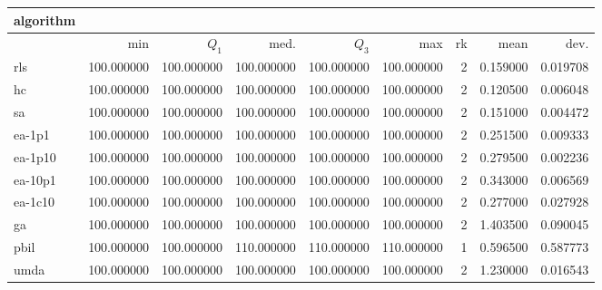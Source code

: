 \begin{tabular}{@{}l*{5}{>{{}}N{3}{0}}>{{}}N{2}{0}N{1}{3}N{1}{3}@{}}
\toprule
{algorithm} &  &  \\
\midrule
& {min} & {$Q_1$} & {med.} & {$Q_3$} & {max} & {rk} & {mean} & {dev.} \\
\midrule
rls & {\color{blue}} 100.000000 & {\color{blue}} 100.000000 & 100.000000 & 100.000000 & 100.000000 & 2 & 0.159000 & 0.019708 \\
 hc & {\color{blue}} 100.000000 & {\color{blue}} 100.000000 & 100.000000 & 100.000000 & 100.000000 & 2 & 0.120500 & 0.006048 \\
 sa & {\color{blue}} 100.000000 & {\color{blue}} 100.000000 & 100.000000 & 100.000000 & 100.000000 & 2 & 0.151000 & 0.004472 \\
 ea-1p1 & {\color{blue}} 100.000000 & {\color{blue}} 100.000000 & 100.000000 & 100.000000 & 100.000000 & 2 & 0.251500 & 0.009333 \\
 ea-1p10 & {\color{blue}} 100.000000 & {\color{blue}} 100.000000 & 100.000000 & 100.000000 & 100.000000 & 2 & 0.279500 & 0.002236 \\
 ea-10p1 & {\color{blue}} 100.000000 & {\color{blue}} 100.000000 & 100.000000 & 100.000000 & 100.000000 & 2 & 0.343000 & 0.006569 \\
 ea-1c10 & {\color{blue}} 100.000000 & {\color{blue}} 100.000000 & 100.000000 & 100.000000 & 100.000000 & 2 & 0.277000 & 0.027928 \\
 ga & {\color{blue}} 100.000000 & {\color{blue}} 100.000000 & 100.000000 & 100.000000 & 100.000000 & 2 & 1.403500 & 0.090045 \\
 pbil & {\color{blue}} 100.000000 & {\color{blue}} 100.000000 & {\color{blue}} 110.000000 & {\color{blue}} 110.000000 & {\color{blue}} 110.000000 & 1 & 0.596500 & 0.587773 \\
 umda & {\color{blue}} 100.000000 & {\color{blue}} 100.000000 & 100.000000 & 100.000000 & 100.000000 & 2 & 1.230000 & 0.016543 \\
 \bottomrule
\end{tabular}

